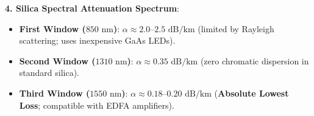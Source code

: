 \begin{theorysol}
\textbf{4. Silica Spectral Attenuation Spectrum}:
\begin{itemize}
    \item \textbf{First Window ($850\text{ nm}$)}: $\alpha \approx 2.0\text{--}2.5\text{ dB/km}$ (limited by Rayleigh scattering; uses inexpensive GaAs LEDs).
    \item \textbf{Second Window ($1310\text{ nm}$)}: $\alpha \approx 0.35\text{ dB/km}$ (zero chromatic dispersion in standard silica).
    \item \textbf{Third Window ($1550\text{ nm}$)}: $\alpha \approx 0.18\text{--}0.20\text{ dB/km}$ (\textbf{Absolute Lowest Loss}; compatible with EDFA amplifiers).
\end{itemize}
\end{theorysol}
\vspace{4mm}

